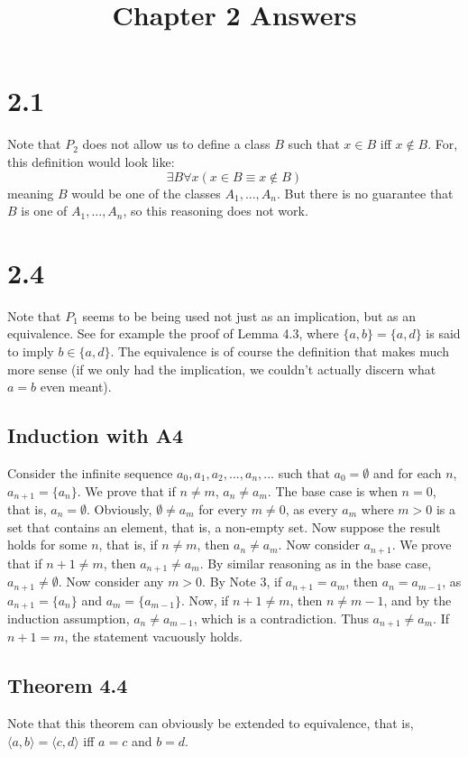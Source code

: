 \documentclass{article}
\title{Chapter 2 Answers}
\theoremstyle{definition}
\begin{document}
\date{}
\maketitle

\section*{2.1}
Note that $P_2$ does not allow us to define a class $B$ such that $x\in B$ iff $x\notin B$. For, this definition would look like:
\[ \exists B\forall x(x\in B\equiv x\notin B) \] meaning $B$ would be one of the classes $A_1,...,A_n$. But there is no guarantee that $B$ is one of 
$A_1,...,A_n$, so this reasoning does not work.

\section*{2.4}
Note that $P_1$ seems to be being used not just as an implication, but as an equivalence. See for example the proof of Lemma 4.3, where 
$\{a,b\}=\{a,d\}$ is said to imply $b\in \{a,d\}$. The equivalence is of course the definition that makes much more sense (if we only had the implication, we 
couldn't actually discern what $a=b$ even meant).

\subsection*{Induction with A4}
Consider the infinite sequence $a_0,a_1,a_2,...,a_n,...$ such that $a_0=\emptyset$ and for each $n$, $a_{n+1}=\{a_n\}$. We prove that 
if $n\ne m$, $a_n\ne a_m$. The base case is when $n=0$, that is, $a_n=\emptyset$. Obviously, $\emptyset\ne a_m$ for every $m\ne 0$, as every 
$a_m$ where $m>0$ is a set that contains an element, that is, a non-empty set. Now suppose the result holds for some $n$, that is, if $n\ne m$, then 
$a_n\ne a_m$. Now consider $a_{n+1}$. We prove that if $n+1\ne m$, then $a_{n+1}\ne a_m$. By similar reasoning as in the base case, $a_{n+1}\ne\emptyset$. 
Now consider any $m>0$. By Note 3, if $a_{n+1}=a_m$, then 
$a_n=a_{m-1}$, as $a_{n+1}=\{a_n\}$ and $a_m=\{a_{m-1}\}$. Now, if $n+1\ne m$, then $n\ne m-1$, and by the induction assumption, $a_n\ne a_{m-1}$, which is a contradiction. 
Thus $a_{n+1}\ne a_m$.
If $n+1=m$, the statement vacuously holds.

\subsection*{Theorem 4.4}
Note that this theorem can obviously be extended to equivalence, that is, $\langle a,b\rangle =\langle c,d\rangle$ iff $a=c$ and $b=d$.
\end{document}
